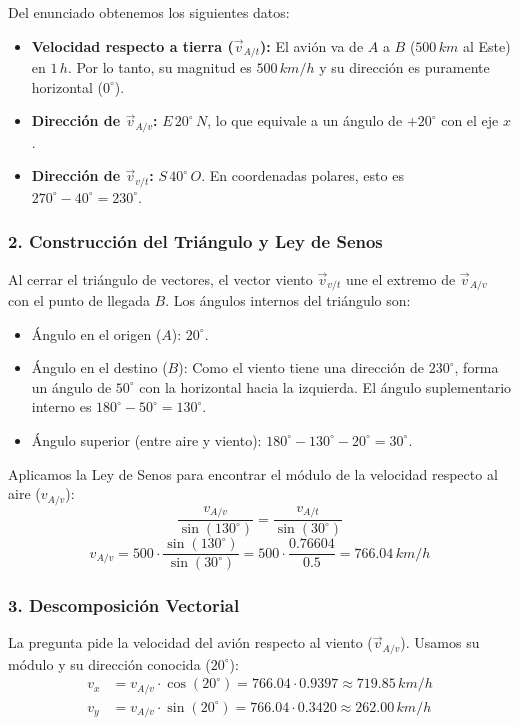 \documentclass[12pt, a4paper]{article}
\begin{document}
Del enunciado obtenemos los siguientes datos:
\begin{itemize}
    \item \textbf{Velocidad respecto a tierra ($\vec{v}_{A/t}$):} El avión va de $A$ a $B$ ($500 \, \si{km}$ al Este) en $1 \, \si{h}$. Por lo tanto, su magnitud es $500 \, \si{km/h}$ y su dirección es puramente horizontal ($0^\circ$).
    \item \textbf{Dirección de $\vec{v}_{A/v}$:} $E \, 20^\circ \, N$, lo que equivale a un ángulo de $+20^\circ$ con el eje $x$.
    \item \textbf{Dirección de $\vec{v}_{v/t}$:} $S \, 40^\circ \, O$. En coordenadas polares, esto es $270^\circ - 40^\circ = 230^\circ$.
\end{itemize}

\subsubsection*{2. Construcción del Triángulo y Ley de Senos}
Al cerrar el triángulo de vectores, el vector viento $\vec{v}_{v/t}$ une el extremo de $\vec{v}_{A/v}$ con el punto de llegada $B$. Los ángulos internos del triángulo son:
\begin{itemize}
    \item Ángulo en el origen ($A$): $20^\circ$.
    \item Ángulo en el destino ($B$): Como el viento tiene una dirección de $230^\circ$, forma un ángulo de $50^\circ$ con la horizontal hacia la izquierda. El ángulo suplementario interno es $180^\circ - 50^\circ = 130^\circ$.
    \item Ángulo superior (entre aire y viento): $180^\circ - 130^\circ - 20^\circ = 30^\circ$.
\end{itemize}

Aplicamos la Ley de Senos para encontrar el módulo de la velocidad respecto al aire ($v_{A/v}$):
\begin{equation}
    \frac{v_{A/v}}{\sin(130^\circ)} = \frac{v_{A/t}}{\sin(30^\circ)}
\end{equation}
\begin{equation}
    v_{A/v} = 500 \cdot \frac{\sin(130^\circ)}{\sin(30^\circ)} = 500 \cdot \frac{0.76604}{0.5} = 766.04 \, \si{km/h}
\end{equation}

\subsubsection*{3. Descomposición Vectorial}
La pregunta pide la velocidad del avión respecto al viento ($\vec{v}_{A/v}$). Usamos su módulo y su dirección conocida ($20^\circ$):
\begin{align*}
    v_x &= v_{A/v} \cdot \cos(20^\circ) = 766.04 \cdot 0.9397 \approx 719.85 \, \si{km/h} \\
    v_y &= v_{A/v} \cdot \sin(20^\circ) = 766.04 \cdot 0.3420 \approx 262.00 \, \si{km/h}
\end{align*}
\end{document}
